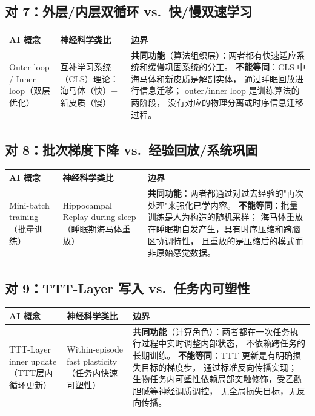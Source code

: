 \subsection*{对 7：外层/内层双循环 vs.\ 快/慢双速学习}

\begin{tabular}{p{4cm} p{3.5cm} p{6cm}}
\toprule
\textbf{AI 概念} & \textbf{神经科学类比} & \textbf{边界} \\
\midrule
Outer-loop / Inner-loop（双层优化）
& 互补学习系统（CLS）理论：海马体（快）+ 新皮质（慢）
& \textbf{共同功能}（算法组织层）：两者都有快速适应系统和缓慢巩固系统的分工。
  \textbf{不能等同}：CLS 中海马体和新皮质是解剖实体，
  通过睡眠回放进行信息迁移；
  outer/inner loop 是训练算法的两阶段，
  没有对应的物理分离或时序信息迁移过程。 \\
\bottomrule
\end{tabular}

\subsection*{对 8：批次梯度下降 vs.\ 经验回放/系统巩固}

\begin{tabular}{p{4cm} p{3.5cm} p{6cm}}
\toprule
\textbf{AI 概念} & \textbf{神经科学类比} & \textbf{边界} \\
\midrule
Mini-batch training（批量训练）
& Hippocampal Replay during sleep（睡眠期海马体重放）
& \textbf{共同功能}：两者都通过对过去经验的"再次处理"来强化已学内容。
  \textbf{不能等同}：批量训练是人为构造的随机采样；
  海马体重放在睡眠期自发产生，具有时序压缩和跨脑区协调特性，
  且重放的是压缩后的模式而非原始感觉数据。 \\
\bottomrule
\end{tabular}

\subsection*{对 9：TTT-Layer 写入 vs.\ 任务内可塑性}

\begin{tabular}{p{4cm} p{3.5cm} p{6cm}}
\toprule
\textbf{AI 概念} & \textbf{神经科学类比} & \textbf{边界} \\
\midrule
TTT-Layer inner update（TTT层内循环更新）
& Within-episode fast plasticity（任务内快速可塑性）
& \textbf{共同功能}（计算角色）：两者都在一次任务执行过程中实时调整内部状态，
  不依赖跨任务的长期训练。
  \textbf{不能等同}：TTT 更新是有明确损失目标的梯度步，
  通过标准反向传播实现；
  生物任务内可塑性依赖局部突触修饰，受乙酰胆碱等神经调质调控，
  无全局损失目标，无反向传播。 \\
\bottomrule
\end{tabular}

